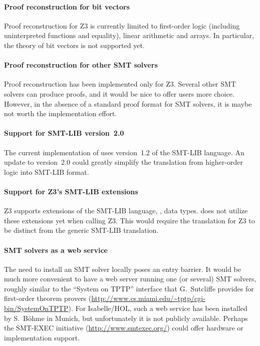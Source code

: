 \paragraph{Proof reconstruction for bit vectors}

Proof reconstruction for Z3 is currently limited to first-order logic
(including uninterpreted functions and equality), linear arithmetic
and arrays.  In particular, the theory of bit vectors is not supported
yet.

\paragraph{Proof reconstruction for other SMT solvers}

Proof reconstruction has been implemented only for Z3.  Several other
SMT solvers can produce proofs, and it would be nice to offer \HOL{}
users more choice.  However, in the absence of a standard proof format
for SMT solvers, it is maybe not worth the implementation effort.

\paragraph{Support for SMT-LIB version~2.0}

The current implementation of  uses version~1.2 of the
SMT-LIB language.  An update to version~2.0 could greatly simplify the
translation from higher-order logic into SMT-LIB format.

\paragraph{Support for Z3's SMT-LIB extensions}

Z3 supports extensions of the SMT-LIB language, \eg, data types.
 does not utilize these extensions yet when calling Z3.
This would require the translation for Z3 to be distinct from the
generic SMT-LIB translation.

\paragraph{SMT solvers as a web service}

The need to install an SMT solver locally poses an entry barrier.  It
would be much more convenient to have a web server running one (or
several) SMT solvers, roughly similar to the ``System on TPTP''
interface that G.~Sutcliffe provides for first-order theorem provers
(\url{http://www.cs.miami.edu/~tptp/cgi-bin/SystemOnTPTP}).  For
Isabelle/HOL, such a web service has been installed by S.~B{\"o}hme in
Munich, but unfortunately it is not publicly available.  Perhaps the
SMT-EXEC initiative (\url{http://www.smtexec.org/}) could offer
hardware or implementation support.


